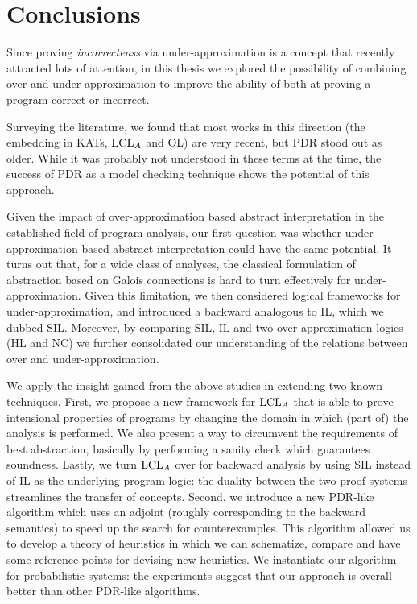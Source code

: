 
\chapter{Conclusions}\label{ch:conclusions}
Since proving \emph{incorrectenss} via under-approximation is a concept that recently attracted lots of attention, in this thesis we explored the possibility of combining over and under-approximation to improve the ability of both at proving a program correct or incorrect.

Surveying the literature, we found that most works in this direction (the embedding in KATs, $\text{LCL}_A$ and OL) are very recent, but PDR stood out as older. While it was probably not understood in these terms at the time, the success of PDR as a model checking technique shows the potential of this approach.

Given the impact of over-approximation based abstract interpretation in the established field of program analysis, our first question was whether under-approximation based abstract interpretation could have the same potential. It turns out that, for a wide class of analyses, the classical formulation of abstraction based on Galois connections is hard to turn effectively for under-approximation. Given this limitation, we then considered logical frameworks for under-approximation, and introduced a backward analogous to IL, which we dubbed SIL. Moreover, by comparing SIL, IL and two over-approximation logics (HL and NC) we further consolidated our understanding of the relations between over and under-approximation.

We apply the insight gained from the above studies in extending two known techniques.
First, we propose a new framework for $\text{LCL}_A$ that is able to prove intensional properties of programs by changing the domain in which (part of) the analysis is performed. We also present a way to circumvent the requirements of best abstraction, basically by performing a sanity check which guarantees soundness. Lastly, we turn $\text{LCL}_A$ over for backward analysis by using SIL instead of IL as the underlying program logic: the duality between the two proof systems streamlines the transfer of concepts.
Second, we introduce a new PDR-like algorithm which uses an adjoint (roughly corresponding to the backward semantics) to speed up the search for counterexamples. This algorithm allowed us to develop a theory of heuristics in which we can schematize, compare and have some reference points for devising new heuristics. We instantiate our algorithm for probabilistic systems: the experiments suggest that our approach is overall better than other PDR-like algorithms.

